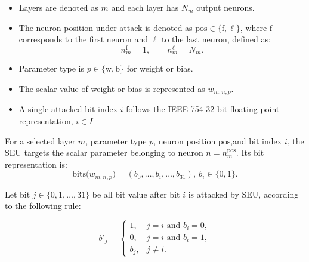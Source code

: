 
\begin{itemize}
    \item Layers are denoted as \( m \) and each layer has \( N_m \) output neurons.
    \item The neuron position under attack is denoted as \( \mathrm{pos} \in \{\mathrm{f}, \ell\} \),
    where \( \mathrm{f} \) corresponds to the first neuron and \( \ell \) to the last neuron, defined as:
    \[
    n_m^{\mathrm{f}} = 1, \qquad n_m^{\ell} = N_m.
    \]
    \item Parameter type is \( p \in \{\mathrm{w}, \mathrm{b}\} \) for weight or bias.
    \item The scalar value of weight or bias is represented as \( w_{m,n,p} \).
    \item A single attacked bit index \( i \) follows the IEEE-754 32-bit floating-point representation, \( i \in I \) 
\end{itemize}
For a selected layer \( m \), parameter type \( p \), neuron position \( \mathrm{pos} \),and bit index \( i \), the SEU targets the scalar parameter belonging to neuron \( n = n_m^{\mathrm{pos}} \).
Its bit representation is:
\[
\mathrm{bits}\big(w_{m,n,p}\big) = (b_{0}, \ldots, b_i, \ldots, b_{31})
,\ b_i \in \{0, 1\}.
\]


Let bit \( j \in \{0, 1, \ldots, 31\} \) be all bit value after bit \( i \) is attacked by SEU, according to the following rule:

\begin{equation}
b'_j =
\begin{cases}
1, & j = i \text{ and } b_i = 0, \\[6pt]
0, & j = i \text{ and } b_i = 1, \\[6pt]
b_j, & j \neq i.
\end{cases}
\label{eq:bitflip_case}
\end{equation}


